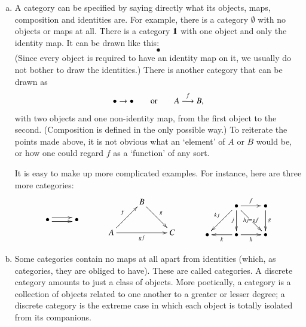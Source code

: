 \begin{examples}
\label{egs:cats-as}
\begin{enumerate}[(b)]
\item
\label{eg:cats-as:graphs}
A category can be specified%
%
%
by saying directly what its objects, maps, composition and identities are.
For example, there is a category $\emptyset$%
%
%
with no objects or maps at all.  There is a category $\mathbf{1}$%
%
%
 with one object
and only the identity map.  It can be drawn like this:
\[
\bullet
\]
(Since every object is required to have an identity map on it, we usually
do not bother to draw the identities.)  There is another category that can
be drawn as
\[
\bullet \to \bullet
\qquad
\text{or}
\qquad
A \stackrel{f}{\longrightarrow} B,
\]
with two objects and one non-identity map, from the first object to the
second.  (Composition is defined in the only possible way.)  To reiterate
the points made above, it is not obvious what an `element' of $A$ or $B$
would be, or how one could regard $f$ as a `function' of any sort.

It is easy to make up more complicated examples.  For instance, here are three
more categories:
\[
\begin{array}{c}
\xymatrix{
\bullet \ar@<.5ex>[r] \ar@<-.5ex>[r] &\bullet
}
\end{array}
\qquad
\begin{array}{c}
\xymatrix{
        &B \ar[dr]^g    &       \\
A \ar[ur]^f \ar[rr]_{gf} & &C
}
\end{array}
\qquad
\begin{array}{c}
\xymatrix{
        &\bullet \ar[dl]_{kj} \ar[r]^f \ar[dr]|{hj=gf} \ar[d]_{j} &
\bullet \ar[d]^g        \\
\bullet &\bullet \ar[l]^k \ar[r]_{h}   &\bullet
}
\end{array}
\]

\item
\label{eg:cats-as:discrete}
Some categories contain no maps at all apart from identities (which, as
categories, they are obliged to have).  These are called %
%
%
categories.  A discrete category amounts to just a class of objects.  More
poetically, a category is a collection of objects related to one another to
a greater or lesser degree; a discrete category is the extreme case in
which each object is totally isolated from its companions.


\end{enumerate}
\end{examples}
